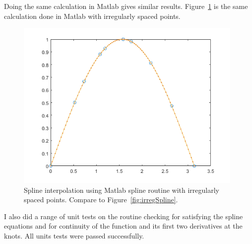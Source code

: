 \documentclass{scrartcl}
\begin{document}
Doing the same calculation in Matlab gives similar results.
Figure~\ref{fig:matSpline} is the same calculation done in Matlab
with irregularly spaced points.
\begin{figure}
\begin{center}
\includegraphics[width=11cm]{matSpline}
\end{center}
\caption{\label{fig:matSpline}Spline interpolation using Matlab
spline routine with irregularly spaced points.
Compare to Figure~\ref{fig:irregSpline}.}
\end{figure}
I also did a range of unit tests on the routine checking for
satisfying the spline equations and for continuity of the function
and its first two derivatives at the knots. All units tests were
passed successfully.
\end{document}
